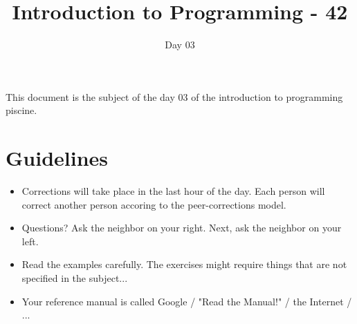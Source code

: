 \documentclass{42-en}
\begin{document}
\title{Introduction to Programming - 42}
\subtitle{Day 03}


\summary
{
This document is the subject of the day 03 of the introduction to programming piscine.
}

\maketitle

\tableofcontents



\chapter{Guidelines}

\begin{itemize}

  \item Corrections will take place in the last hour of the day. Each person will correct another person accoring to the peer-corrections model.
 
  \item Questions? Ask the neighbor on your right. Next, ask the neighbor on your left.
  
  \item Read the examples carefully. The exercises might require things that are not specified in the subject...

  \item Your reference manual is called Google / "Read the Manual!" / the Internet / ...

\end{itemize}

\newpage


\end{document}
